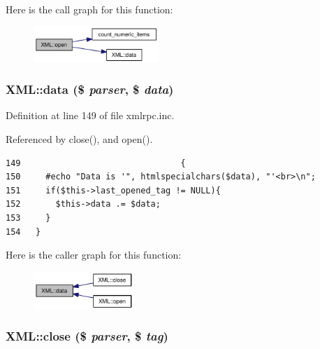 Here is the call graph for this function:\nopagebreak
\begin{figure}[H]
\begin{center}
\leavevmode
\includegraphics[width=134pt]{classXML_eac7eae74d866d4f5a0cdb9be27ff279_cgraph}
\end{center}
\end{figure}
\hypertarget{classXML_ca70dfbd3e8ce956075181701b09b033}{
\subsubsection{\setlength{\rightskip}{0pt plus 5cm}XML::data (\$ {\em parser}, \$ {\em data})}}
\label{classXML_ca70dfbd3e8ce956075181701b09b033}




Definition at line 149 of file xmlrpc.inc.

Referenced by close(), and open().

\begin{Code}\begin{verbatim}149                                {
150     #echo "Data is '", htmlspecialchars($data), "'<br>\n";
151     if($this->last_opened_tag != NULL){
152       $this->data .= $data;
153     }
154   }
\end{verbatim}
\end{Code}




Here is the caller graph for this function:\nopagebreak
\begin{figure}[H]
\begin{center}
\leavevmode
\includegraphics[width=107pt]{classXML_ca70dfbd3e8ce956075181701b09b033_icgraph}
\end{center}
\end{figure}
\hypertarget{classXML_60144a2134fc1b7f5b4b1b6a7c56bf04}{
\subsubsection{\setlength{\rightskip}{0pt plus 5cm}XML::close (\$ {\em parser}, \$ {\em tag})}}
\label{classXML_60144a2134fc1b7f5b4b1b6a7c56bf04}




